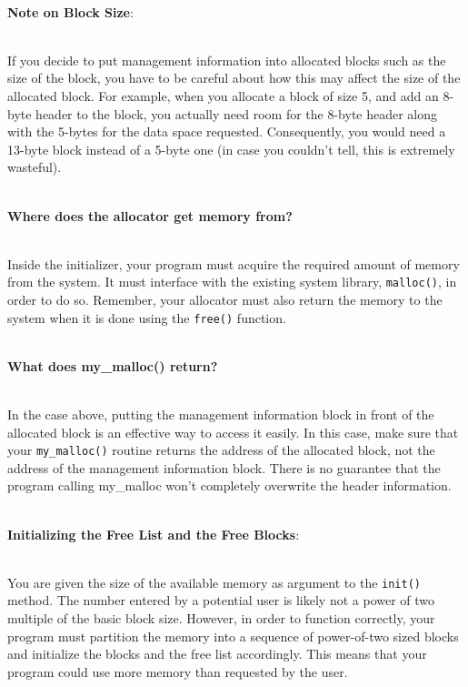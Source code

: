 \documentclass[12pt]{extarticle}
\newenvironment{myindentpar}[1]%
 {\begin{list}{}%
         {\setlength{\leftmargin}{#1}}%
         \item[]%
 }
 {\end{list}}
\newcommand{\code}[1]{\colorbox{codegray}{\texttt{#1}}}
\begin{document}
\begin{myindentpar}{6.5mm}
    \ \\
    \textbf{Note on Block Size}:
    
    \ \\
    If you decide to put management information into allocated blocks such as the size of the block, you have to be careful about how this may affect the size of the allocated block.  For example, when you allocate a block of size 5, and add an 8-byte header to the block, you actually need room for the 8-byte header along with the 5-bytes for the data space requested.  Consequently, you would need a 13-byte block instead of a 5-byte one (in case you couldn't tell, this is extremely wasteful).  
    
    \ \\
    \textbf{Where does the allocator get memory from?}
    
    \ \\
    Inside the initializer, your program must acquire the required amount of memory from the system.  It must interface with the existing system library, \code{malloc()}, in order to do so.  Remember, your allocator must also return the memory to the system when it is done using the \code{free()} function.  
    
    \ \\
    \textbf{What does my\_malloc() return?}
    
    \ \\
    In the case above, putting the management information block in front of the allocated block is an effective way to access it easily.  In this case, make sure that your \code{my\_malloc()} routine returns the address of the allocated block, not the address of the management information block.  There is no guarantee that the program calling my\_malloc won't completely overwrite the header information.  
    
    \ \\
    \textbf{Initializing the Free List and the Free Blocks}: 
    
    \ \\
    You are given the size of the available memory as argument to the \code{init()} method.  The number entered by a potential user is likely not a power of two multiple of the basic block size.  However, in order to function correctly, your program must partition the memory into a sequence of power-of-two sized blocks and initialize the blocks and the free list accordingly.  This means that your program could use more memory than requested by the user.  

\end{myindentpar}
\end{document}
